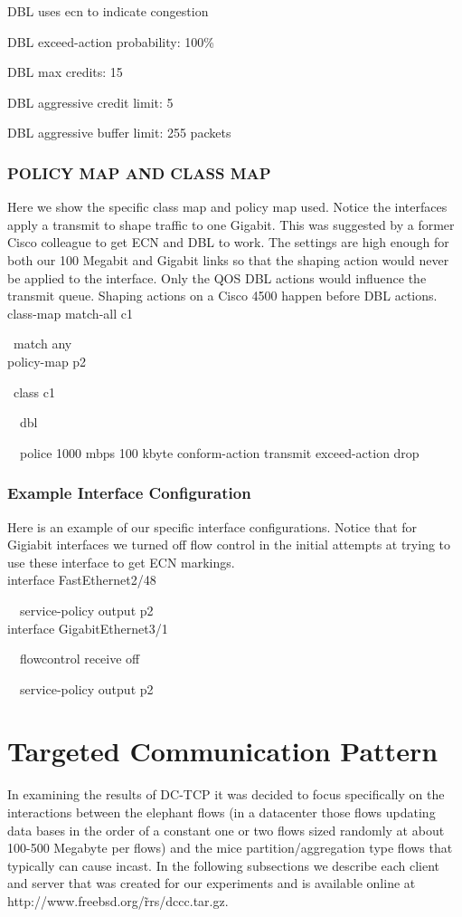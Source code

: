 \documentclass[12pt]{article}
\begin{document}
DBL uses ecn to indicate congestion

DBL exceed-action probability: 100\%

DBL max credits: 15

DBL aggressive credit limit: 5

DBL aggressive buffer limit: 255 packets


\subsubsection {POLICY MAP AND CLASS MAP}

Here we show the specific class map and policy map used. Notice
the interfaces apply a  transmit to shape traffic to one Gigabit. This was suggested
by a former Cisco colleague to get ECN and DBL to work. The settings
are high enough for both our 100 Megabit and Gigabit links so that 
the shaping action would never be applied to the interface. Only the
QOS DBL actions would influence the transmit queue. Shaping actions
on a Cisco 4500 happen before DBL actions.
\\

class-map match-all c1

~match any 
\\

policy-map p2

~class c1
  
~~dbl
    
~~police 1000 mbps 100 kbyte conform-action transmit exceed-action drop 

\subsubsection {Example Interface Configuration}

Here is an example of our specific interface configurations. Notice that 
for Gigiabit interfaces we turned off flow control in the initial attempts at
trying to use these interface to get ECN markings.
\\

interface FastEthernet2/48

~~service-policy output p2
\\


interface GigabitEthernet3/1

~~flowcontrol receive off
 
~~service-policy output p2


 
\section{Targeted Communication Pattern}
In examining the results of DC-TCP it was decided to focus specifically on the interactions between
the elephant flows (in a datacenter those flows updating data bases in the order of a constant one or two flows
sized randomly at about 100-500 Megabyte per flows) and the mice partition/aggregation type flows that typically 
can cause incast. In the following subsections we describe each client and server that was created for
our experiments and is available online at http://www.freebsd.org/\~rrs/dccc.tar.gz.
\end{document}
